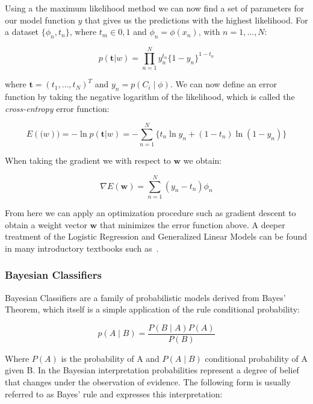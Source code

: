 Using a the maximum likelihood method we can now find a set of parameters for our model function $y$ that gives us the predictions with the highest likelihood. For a dataset $\{ \phi_n, t_n \}$, where $t_m \in {0, 1}$ and $\phi_n = \phi(x_n)$, with $n = 1, . . ., N$:

\begin{equation}
  p(\mathbf{t} | w) = \prod_{n=1}^N y_n^{t_n} \{ 1 - y_n \}^{1-t_n}
\end{equation}

where $\mathbf{t} = (t_1, \ldots, t_N)^T$ and $y_n = p(C_i \mid \phi)$. We can now define an error function by taking the negative logarithm of the likelihood, which is called the \emph{cross-entropy} error function:

\begin{equation}
  E(\mathbf(w)) = - \ln p(\mathbf{t} | w) = - \sum_{n=1}^N \{ t_n \ln y_n + (1 - t_n) \ln (1-y_n) \}
\end{equation}

When taking the gradient we with respect to $\mathbf{w}$ we obtain:

\begin{equation}
  \nabla E(\mathbf{w}) = \sum_{n=1}^N (y_n - t_n) \phi_n
\end{equation}

From here we can apply an optimization procedure such as gradient descent to obtain a weight vector $\mathbf{w}$ that minimizes the error function above. A deeper treatment of the Logistic Regression and Generalized Linear Models can be found in many introductory textbooks such as~\cite[Chapter 4.3.2, p.~205]{Bishop:2006aa}.


\subsubsection{Bayesian Classifiers}
\label{subs:Bayesian Classifiers}

Bayesian Classifiers are a family of probabilistic models derived from Bayes' Theorem, which itself is a simple application of the rule conditional probability:

\begin{equation}
  p(A \mid B) = \frac{P(B \mid A) P(A)}{P(B)}
\end{equation}

Where $P(A)$ is the probability of A and $P(A \mid B)$ conditional probability of A given B. In the Bayesian interpretation probabilities represent a degree of belief that changes under the observation of evidence. The following form is usually referred to as Bayes' rule and expresses this interpretation:


